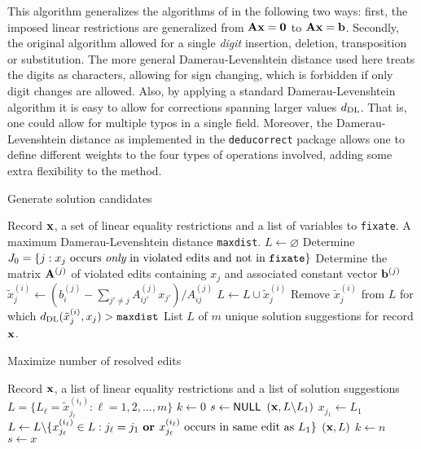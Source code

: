 \documentclass[11pt, fleqn, a4paper]{article}
\begin{document}
This algorithm generalizes the algorithms of \cite{scholtus:2009} in the
following two ways: first, the imposed linear restrictions are generalized from
${\bf Ax=0}$ to $\bf Ax=b$. Secondly, the original algorithm allowed for a single {\em
digit} insertion, deletion, transposition or substitution. The more general
Damerau-Levenshtein distance used here treats the digits as characters,
allowing for sign changing, which is forbidden if only digit changes are
allowed. Also, by applying a standard Damerau-Levenshtein algorithm it is easy
to allow for corrections spanning larger values $d_{\rm DL}$. That is, one
could allow for multiple typos in a single field. Moreover, the
Damerau-Levenshtein distance as implemented in the {\tt deducorrect} package
allows one to define different weights to the four types of operations
involved, adding some extra flexibility to the method.
%
%
\begin{algorithm}[t]
\caption{Generate solution candidates}
\label{generateCandidates}
\begin{algorithmic}[1]
\Require Record $\bf x$, a set of linear equality restrictions and a list of variables to {\tt fixate}. A maximum
Damerau-Levenshtein distance {\tt maxdist}.
\State $L\leftarrow\varnothing$
\State Determine $J_0=\{j: x_j \textrm{ occurs {\em only} in violated edits and not in {\tt fixate}}\}$
\State Determine the matrix ${\bf A}^{(j)}$ of violated edits containing $x_j$ and associated constant vector ${\bf b}^{(j)}$
\State $\tilde{x}_j^{(i)} \leftarrow \left(b_i^{(j)}-\sum_{j'\not=j}A_{ij'}^{(j)}x_{j'}\right)/A_{ij}^{(j)} $
\State $L\leftarrow L\cup\tilde{x}_j^{(i)}$ 
\EndFor
\EndFor
\State Remove $\tilde{x}^{(i)}_j$ from $L$ for which $d_{\rm DL}(\tilde{x}^{(i)}_j,x_j)>{\tt maxdist}$ 
\Ensure List $L$ of $m$ unique solution suggestions for record ${\bf x}$.
\end{algorithmic}
\end{algorithm}
%
\begin{algorithm}[t]
\caption{Maximize number of resolved edits}
\label{maximizeResolvedEdits}
\begin{algorithmic}[1]
\Require Record ${\bf x}$, a list of linear equality restrictions and a list of solution suggestions
$L = \{L_\ell=\tilde{x}^{(i_\ell)}_{j_\ell}:\ell=1,2,\ldots, m\}$
\State $k\leftarrow 0$ 
\State $s\leftarrow {\sf NULL}$
$({\bf x},L\backslash L_1)$
\State $x_{j_1}\leftarrow L_1$ 
\State $L\leftarrow L\backslash \{x^{(i_\ell)}_{j_\ell}\in L: j_\ell=j_1 \textrm{ \bf  or } x^{(i_\ell)}_{j_\ell}\textrm{ occurs in same edit as } L_1\}$
$({\bf x},L)$
\Else
{}
\State $k \leftarrow n$
\State $s \leftarrow x$
\EndIf
\EndIf
\EndProcedure
{}
\end{algorithmic}
\end{algorithm}
\end{document}

